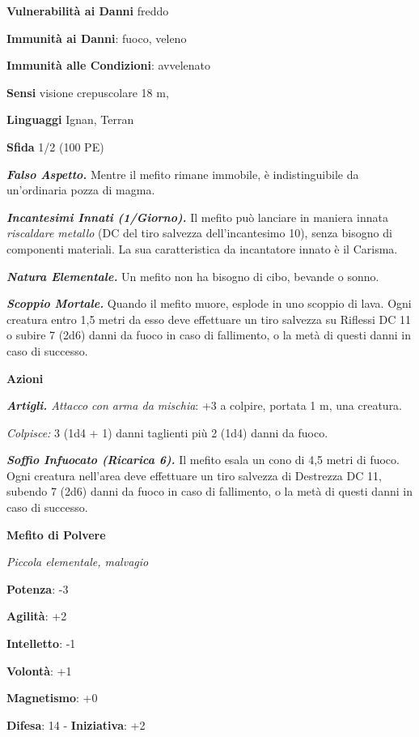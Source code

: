 \begin{multicols}{2}
\textbf{Vulnerabilità ai Danni} freddo

\textbf{Immunità ai Danni}: fuoco, veleno

\textbf{Immunità alle Condizioni}: avvelenato

\textbf{Sensi} visione crepuscolare 18 m, 

\textbf{Linguaggi} Ignan, Terran

\textbf{Sfida} 1/2 (100 PE)\smallskip

\emph{\textbf{Falso Aspetto.}} Mentre il mefito rimane immobile, è
indistinguibile da un'ordinaria pozza di magma.

\emph{\textbf{Incantesimi Innati (1/Giorno).}} Il mefito può lanciare in
maniera innata \emph{riscaldare metallo} (DC del tiro salvezza
dell'incantesimo 10), senza bisogno di componenti materiali. La sua
caratteristica da incantatore innato è il Carisma.

\emph{\textbf{Natura Elementale.}} Un mefito non ha bisogno di cibo,
bevande o sonno.

\emph{\textbf{Scoppio Mortale.}} Quando il mefito muore, esplode in uno
scoppio di lava. Ogni creatura entro 1,5 metri da esso deve effettuare
un tiro salvezza su Riflessi DC 11 o subire 7 (2d6) danni da fuoco in
caso di fallimento, o la metà di questi danni in caso di successo.

\smallskip\textbf{Azioni}

\emph{\textbf{Artigli.} Attacco con arma da mischia}: +3 a colpire,
portata 1 m, una creatura.

\emph{Colpisce:} 3 (1d4 + 1) danni taglienti più 2 (1d4) danni da fuoco.

\emph{\textbf{Soffio Infuocato (Ricarica 6).}} Il mefito esala un cono
di 4,5 metri di fuoco. Ogni creatura nell'area deve effettuare un tiro
salvezza di Destrezza DC 11, subendo 7 (2d6) danni da fuoco in caso di
fallimento, o la metà di questi danni in caso di successo.



\textbf{Mefito di Polvere}

\emph{Piccola elementale, malvagio}

\textbf{Potenza}: -3

\textbf{Agilità}: +2

\textbf{Intelletto}: -1

\textbf{Volontà}: +1

\textbf{Magnetismo}: +0

\textbf{Difesa}: 14 - \textbf{Iniziativa}: +2


\end{multicols}
